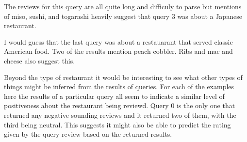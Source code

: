 \documentclass[paper=a4, fontsize=11pt]{jhwhw} %
\begin{document}
The reviews for this query are all quite long and difficuly to parse but mentions of miso, sushi, and togarashi heavily suggest that query 3 was about a Japanese restaurant. 

I would guess that the last query was about a restauarant that served classic American food. Two of the results mention peach cobbler. Ribs and mac and cheese also suggest this.

Beyond the type of restaurant it would be interesting to see what other types of things might be inferred from the results of queries. For each of the examples here the results of a particular query all seem to indicate a similar level of positiveness about the restaurant being reviewd. Query 0 is the only one that returned any negative sounding reviews and it returned two of them, with the third being neutral. This suggests it might also be able to predict the rating given by the query review based on the returned results.
\end{document}
